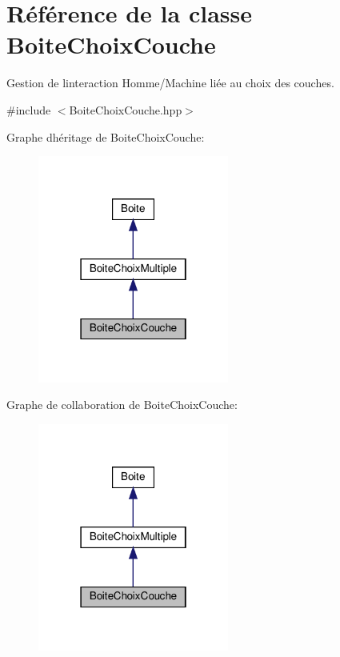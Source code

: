 \hypertarget{classBoiteChoixCouche}{}\section{Référence de la classe Boite\+Choix\+Couche}
\label{classBoiteChoixCouche}


Gestion de l\textquotesingle{}interaction Homme/\+Machine liée au choix des couches.  




{\ttfamily \#include $<$Boite\+Choix\+Couche.\+hpp$>$}



Graphe d\textquotesingle{}héritage de Boite\+Choix\+Couche\+:
\nopagebreak
\begin{figure}[H]
\begin{center}
\leavevmode
\includegraphics[width=178pt]{classBoiteChoixCouche__inherit__graph}
\end{center}
\end{figure}


Graphe de collaboration de Boite\+Choix\+Couche\+:
\nopagebreak
\begin{figure}[H]
\begin{center}
\leavevmode
\includegraphics[width=178pt]{classBoiteChoixCouche__coll__graph}
\end{center}
\end{figure}
